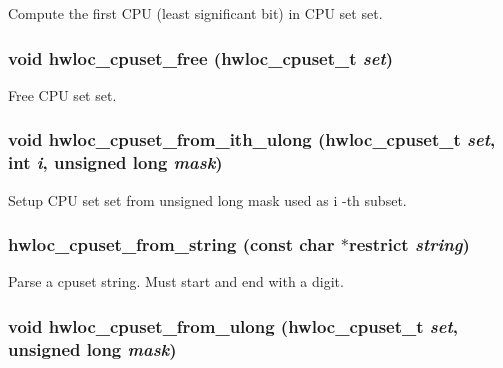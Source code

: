Compute the first CPU (least significant bit) in CPU set {\ttfamily set}. \hypertarget{group__hwlocality__cpuset_gaf5d5a9e082a43f8311fdcff55e611b23}{
\subsubsection[{hwloc\_\-cpuset\_\-free}]{\setlength{\rightskip}{0pt plus 5cm}void hwloc\_\-cpuset\_\-free ({\bf hwloc\_\-cpuset\_\-t} {\em set})}}
\label{group__hwlocality__cpuset_gaf5d5a9e082a43f8311fdcff55e611b23}


Free CPU set {\ttfamily set}. \hypertarget{group__hwlocality__cpuset_gae681e6cd7486dbd03185a8760dc2fa5e}{
\subsubsection[{hwloc\_\-cpuset\_\-from\_\-ith\_\-ulong}]{\setlength{\rightskip}{0pt plus 5cm}void hwloc\_\-cpuset\_\-from\_\-ith\_\-ulong ({\bf hwloc\_\-cpuset\_\-t} {\em set}, \/  int {\em i}, \/  unsigned long {\em mask})}}
\label{group__hwlocality__cpuset_gae681e6cd7486dbd03185a8760dc2fa5e}


Setup CPU set {\ttfamily set} from unsigned long {\ttfamily mask} used as {\ttfamily i} -\/th subset. \hypertarget{group__hwlocality__cpuset_ga63e62db35640c1b90684952d7a3b5175}{
\subsubsection[{hwloc\_\-cpuset\_\-from\_\-string}]{ hwloc\_\-cpuset\_\-from\_\-string (const char $\ast$restrict {\em string})}}
\label{group__hwlocality__cpuset_ga63e62db35640c1b90684952d7a3b5175}


Parse a cpuset string. Must start and end with a digit. \hypertarget{group__hwlocality__cpuset_ga1dbccf3bbf6e6ec0464bfd9e4d47e5cb}{
\subsubsection[{hwloc\_\-cpuset\_\-from\_\-ulong}]{\setlength{\rightskip}{0pt plus 5cm}void hwloc\_\-cpuset\_\-from\_\-ulong ({\bf hwloc\_\-cpuset\_\-t} {\em set}, \/  unsigned long {\em mask})}}
\label{group__hwlocality__cpuset_ga1dbccf3bbf6e6ec0464bfd9e4d47e5cb}


